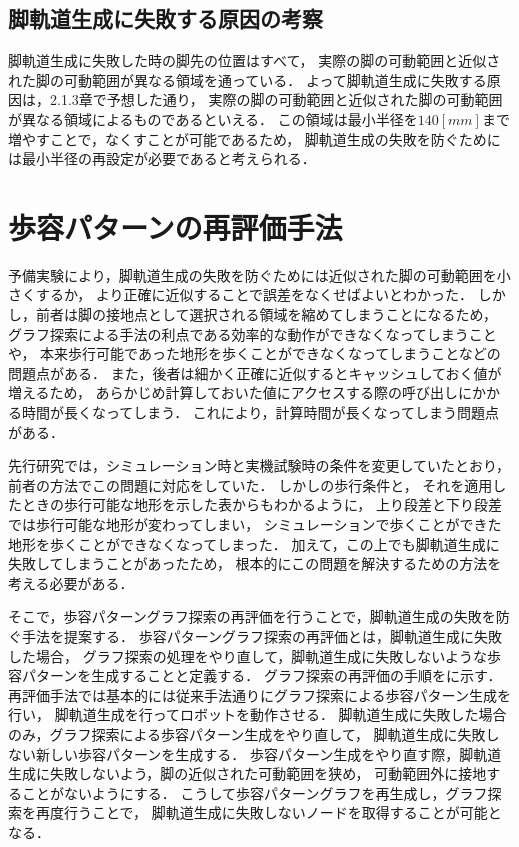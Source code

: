 \subsection{脚軌道生成に失敗する原因の考察}
脚軌道生成に失敗した時の脚先の位置はすべて，
実際の脚の可動範囲と近似された脚の可動範囲が異なる領域を通っている．
よって脚軌道生成に失敗する原因は，2.1.3章で予想した通り，
実際の脚の可動範囲と近似された脚の可動範囲が異なる領域によるものであるといえる．
この領域は最小半径を$140 [mm]$まで増やすことで，なくすことが可能であるため，
脚軌道生成の失敗を防ぐためには最小半径の再設定が必要であると考えられる．

\section{歩容パターンの再評価手法}
予備実験により，脚軌道生成の失敗を防ぐためには近似された脚の可動範囲を小さくするか，
より正確に近似することで誤差をなくせばよいとわかった．
しかし，前者は脚の接地点として選択される領域を縮めてしまうことになるため，
グラフ探索による手法の利点である効率的な動作ができなくなってしまうことや，
本来歩行可能であった地形を歩くことができなくなってしまうことなどの問題点がある．
また，後者は細かく正確に近似するとキャッシュしておく値が増えるため，
あらかじめ計算しておいた値にアクセスする際の呼び出しにかかる時間が長くなってしまう．
これにより，計算時間が長くなってしまう問題点がある．

先行研究では，シミュレーション時と実機試験時の条件を変更していたとおり，
前者の方法でこの問題に対応をしていた．
しかしの歩行条件と，
それを適用したときの歩行可能な地形を示した表からもわかるように，
上り段差と下り段差では歩行可能な地形が変わってしまい，
シミュレーションで歩くことができた地形を歩くことができなくなってしまった．
加えて，この上でも脚軌道生成に失敗してしまうことがあったため，
根本的にこの問題を解決するための方法を考える必要がある．

そこで，歩容パターングラフ探索の再評価を行うことで，脚軌道生成の失敗を防ぐ手法を提案する．
歩容パターングラフ探索の再評価とは，脚軌道生成に失敗した場合，
グラフ探索の処理をやり直して，脚軌道生成に失敗しないような歩容パターンを生成することと定義する．
グラフ探索の再評価の手順をに示す．
再評価手法では基本的には従来手法通りにグラフ探索による歩容パターン生成を行い，
脚軌道生成を行ってロボットを動作させる．
脚軌道生成に失敗した場合のみ，グラフ探索による歩容パターン生成をやり直して，
脚軌道生成に失敗しない新しい歩容パターンを生成する．
歩容パターン生成をやり直す際，脚軌道生成に失敗しないよう，脚の近似された可動範囲を狭め，
可動範囲外に接地することがないようにする．
こうして歩容パターングラフを再生成し，グラフ探索を再度行うことで，
脚軌道生成に失敗しないノードを取得することが可能となる．

